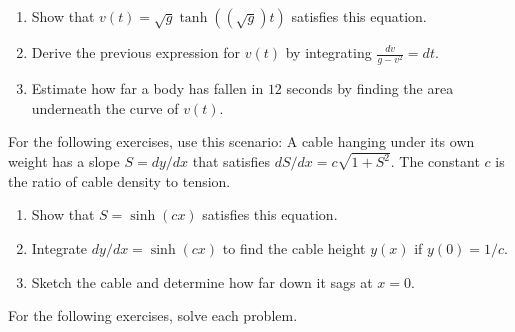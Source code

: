 \documentclass{exercises}
\begin{document}
\begin{enumerate}[resume]
\item Show that $v(t)=\sqrt{g}\tanh((\sqrt{g})t)$ satisfies this equation.
\item Derive the previous expression for $v(t)$ by integrating $\frac{dv}{g-v^{2}}=dt$.
\item \techrequired Estimate how far a body has fallen in $12$ seconds by finding the area underneath the curve of $v(t)$.
\end{enumerate}

For the following exercises, use this scenario: A cable hanging under its own weight has a slope $S=dy/dx$ that satisfies $dS/dx=c\sqrt{1+S^{2}}$. The constant $c$ is the ratio of cable density to tension.

\begin{enumerate}[resume]
\item Show that $S=\sinh(cx)$ satisfies this equation.
\item Integrate $dy/dx=\sinh(cx)$ to find the cable height $y(x)$ if $y(0)=1/c$.
\item Sketch the cable and determine how far down it sags at $x=0$.
\end{enumerate}

For the following exercises, solve each problem.
\end{document}
